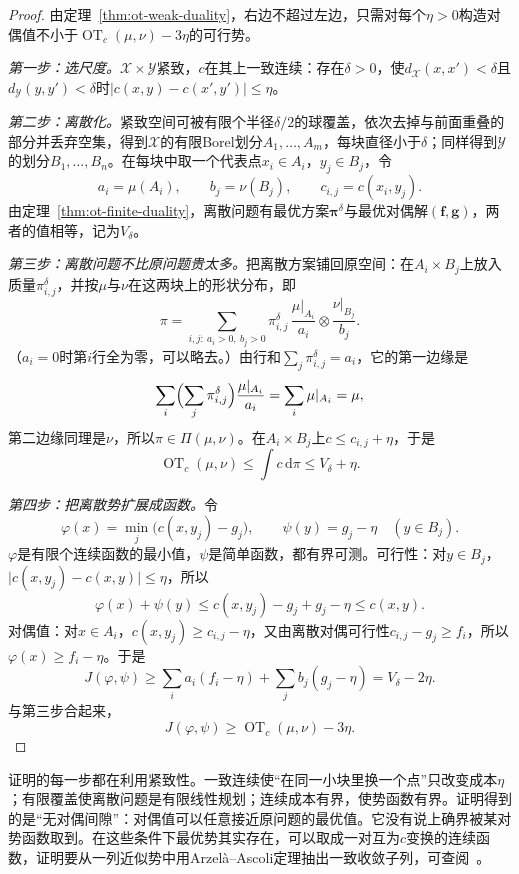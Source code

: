 \begin{proof}
由定理~\ref{thm:ot-weak-duality}，右边不超过左边，只需对每个$\eta>0$构造对偶值不小于$\operatorname{OT}_c(\mu,\nu)-3\eta$的可行势。

\emph{第一步：选尺度。}$\mathcal{X}\times\mathcal{Y}$紧致，$c$在其上一致连续：存在$\delta>0$，使$d_{\mathcal{X}}(x,x')<\delta$且$d_{\mathcal{Y}}(y,y')<\delta$时$\lvert c(x,y)-c(x',y')\rvert\leq\eta$。

\emph{第二步：离散化。}紧致空间可被有限个半径$\delta/2$的球覆盖，依次去掉与前面重叠的部分并丢弃空集，得到$\mathcal{X}$的有限Borel划分$A_1,\dots,A_m$，每块直径小于$\delta$；同样得到$\mathcal{Y}$的划分$B_1,\dots,B_n$。在每块中取一个代表点$x_i\in A_i$，$y_j\in B_j$，令
\[
 a_i=\mu(A_i),\qquad b_j=\nu(B_j),\qquad c_{i,j}=c(x_i,y_j).
\]
由定理~\ref{thm:ot-finite-duality}，离散问题有最优方案$\bm{\pi}^{\delta}$与最优对偶解$(\bm{f},\bm{g})$，两者的值相等，记为$V_\delta$。

\emph{第三步：离散问题不比原问题贵太多。}把离散方案铺回原空间：在$A_i\times B_j$上放入质量$\pi^{\delta}_{i,j}$，并按$\mu$与$\nu$在这两块上的形状分布，即
\[
 \pi=\sum_{i,j:\ a_i>0,\ b_j>0}\pi^{\delta}_{i,j}\,\frac{\mu|_{A_i}}{a_i}\otimes\frac{\nu|_{B_j}}{b_j} .
\]
（$a_i=0$时第$i$行全为零，可以略去。）由行和$\sum_j\pi^{\delta}_{i,j}=a_i$，它的第一边缘是
\[
 \sum_i\Bigl(\sum_j\pi^{\delta}_{i,j}\Bigr)\frac{\mu|_{A_i}}{a_i}=\sum_i\mu|_{A_i}=\mu ,
\]
第二边缘同理是$\nu$，所以$\pi\in\Pi(\mu,\nu)$。在$A_i\times B_j$上$c\leq c_{i,j}+\eta$，于是
\[
 \operatorname{OT}_c(\mu,\nu)\leq\int c\,\mathrm{d}\pi\leq V_\delta+\eta .
\]

\emph{第四步：把离散势扩展成函数。}令
\[
 \varphi(x)=\min_{j}\bigl(c(x,y_j)-g_j\bigr),\qquad \psi(y)=g_j-\eta\quad(y\in B_j).
\]
$\varphi$是有限个连续函数的最小值，$\psi$是简单函数，都有界可测。可行性：对$y\in B_j$，$\lvert c(x,y_j)-c(x,y)\rvert\leq\eta$，所以
\[
 \varphi(x)+\psi(y)\leq c(x,y_j)-g_j+g_j-\eta\leq c(x,y).
\]
对偶值：对$x\in A_i$，$c(x,y_j)\geq c_{i,j}-\eta$，又由离散对偶可行性$c_{i,j}-g_j\geq f_i$，所以$\varphi(x)\geq f_i-\eta$。于是
\[
 J(\varphi,\psi)\geq\sum_ia_i(f_i-\eta)+\sum_jb_j(g_j-\eta)=V_\delta-2\eta .
\]
与第三步合起来，
\[
 J(\varphi,\psi)\geq\operatorname{OT}_c(\mu,\nu)-3\eta .
\]
\end{proof}

证明的每一步都在利用紧致性。一致连续使“在同一小块里换一个点”只改变成本$\eta$；有限覆盖使离散问题是有限线性规划；连续成本有界，使势函数有界。证明得到的是“无对偶间隙”：对偶值可以任意接近原问题的最优值。它没有说上确界被某对势函数取到。在这些条件下最优势其实存在，可以取成一对互为$c$变换的连续函数，证明要从一列近似势中用Arzelà--Ascoli定理抽出一致收敛子列，可查阅~。

